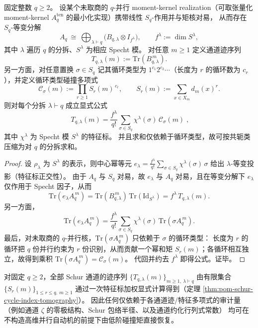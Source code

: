 \begin{theorem}\label{thm:pom-schur-cycle-index-tomography}
固定整数 \(q\ge 2\)。
设某个未取商的 \(q\)-并行 moment-kernel realization（可取张量化 moment-kernel \(A_q^{\mathrm{ten}}\) 的最小化实现）携带线性 \(S_q\)-作用并与矩核对易，
从而存在 \(S_q\)-等变分解
\[
A_q\ \cong\ \bigoplus_{\lambda\vdash q}\bigl(B_{q,\lambda}\otimes I_{f^\lambda}\bigr),
\qquad f^\lambda:=\dim S^\lambda,
\]
其中 \(\lambda\) 遍历 \(q\) 的分拆、\(S^\lambda\) 为相应 Specht 模。
对任意 \(m\ge 1\) 定义通道迹序列
\[
T_{q,\lambda}(m):=\mathrm{Tr}\!\left(B_{q,\lambda}^{\,m}\right).
\]
另一方面，对任意置换 \(\sigma\in S_q\) 记其循环类型为 \(1^{c_1}2^{c_2}\cdots\)（长度为 \(r\) 的循环数为 \(c_r\)），并定义循环类型碰撞多项式
\[
\mathcal{C}_\sigma(m):=\prod_{r\ge 1} S_r(m)^{\,c_r},
\qquad
S_r(m):=\sum_{x\in X_m} d_m(x)^r.
\]
则对每个分拆 \(\lambda\vdash q\) 成立显式公式
\[
\boxed{\;
T_{q,\lambda}(m)
=
\frac{f^\lambda}{q!}\sum_{\sigma\in S_q}\chi^\lambda(\sigma)\,\mathcal{C}_\sigma(m)\; },
\]
其中 \(\chi^\lambda\) 为 Specht 模 \(S^\lambda\) 的特征标。
并且求和仅依赖于循环类型，故可按共轭类压缩为对 \(q\) 的分拆求和。
\end{theorem}
\begin{proof}
设 \(\rho_\lambda\) 为 \(S^\lambda\) 的表示，则中心幂等元
\(
e_\lambda=\frac{f^\lambda}{q!}\sum_{\sigma\in S_q}\chi^\lambda(\sigma)\,\sigma
\)
给出 \(\lambda\)-等变投影（特征标正交性）。
由于 \(A_q\) 与 \(S_q\) 对易，故 \(e_\lambda\) 与 \(A_q\) 对易，且在等变分解下 \(e_\lambda\) 仅作用于 Specht 因子，从而
\[
\mathrm{Tr}(e_\lambda A_q^{\,m})=\mathrm{Tr}(B_{q,\lambda}^{\,m})\,\mathrm{Tr}(\mathrm{Id}_{S^\lambda})
=f^\lambda\,T_{q,\lambda}(m).
\]
另一方面，
\[
\mathrm{Tr}(e_\lambda A_q^{\,m})
=\frac{f^\lambda}{q!}\sum_{\sigma\in S_q}\chi^\lambda(\sigma)\,\mathrm{Tr}(\sigma A_q^{\,m}).
\]
最后，对未取商的 \(q\)-并行核，\(\mathrm{Tr}(\sigma A_q^{\,m})\) 只依赖于 \(\sigma\) 的循环类型：
长度为 \(r\) 的循环把 \(q\) 份并行约束为 \(r\) 份识别，从而贡献一个幂和矩 \(S_r(m)\)；各循环相互独立，故得到乘积
\(
\mathrm{Tr}(\sigma A_q^{\,m})=\mathcal{C}_\sigma(m)
\)。
代回并约去 \(f^\lambda\) 即得公式。证毕。
\end{proof}

\begin{corollary}\label{cor:pom-schur-spectrum-audit-from-low-moments}
对固定 \(q\ge 2\)，全部 Schur 通道的迹序列 \(\{T_{q,\lambda}(m)\}_{m\ge 1,\ \lambda\vdash q}\)
由有限集合 \(\{S_r(m)\}_{1\le r\le q,\ m\ge 1}\) 通过一次特征标加权显式计算得到（定理 \ref{thm:pom-schur-cycle-index-tomography}）。
因此任何仅依赖于各通道迹/特征多项式的审计量（例如通道 \(\zeta\) 的零极结构、Schur 包络半径、以及通道约化行列式常数）
均可在不构造高维并行自动机的前提下由低阶碰撞矩直接恢复。
\end{corollary}

